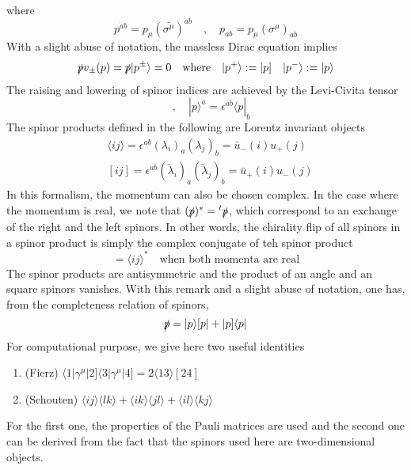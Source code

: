 where 
\begin{equation*}
p^{\dot{a}b} = p_\mu(\bar{\sigma^\mu})^{\dot{a}b}
\quad,\quad
p_{a\dot{b}} = p_\mu(\sigma^\mu)_{a\dot{b}}
\end{equation*}
With a slight abuse of notation, the massless Dirac equation implies
\begin{equation*}
\slashed{p}v_\pm (p) = \slashed{p}|p^\pm\rangle = 0
\quad \mathrm{where}\quad
|p^+\rangle := |p]
\quad
|p^-\rangle := |p\rangle
\end{equation*}
The raising and lowering of spinor indices are achieved by the Levi-Civita tensor
\begin{equation*}
[p|^a = \epsilon^{ab}|p] \quad,\quad
|p\rangle^{\dot{a}} = \epsilon^{\dot{a}\dot{b}}\langle p |_{\dot{b}}
\end{equation*}
The spinor products defined in the following are Lorentz invariant objects
\begin{equation*}
\begin{split}
& \langle ij \rangle = \epsilon^{ab}(\lambda_i)_a(\lambda_j)_b = \bar{u}_-(i)u_+(j)
\\
& [ij] = \epsilon^{\dot{a}\dot{b}}(\tilde{\lambda}_i)_{\dot{a}}(\tilde{\lambda}_j)_{\dot{b}} = \bar{u}_+(i)u_-(j)
\end{split}
\end{equation*}
In this formalism, the momentum can also be chosen complex. 
In the case where the momentum is real, we note that
$(\slashed{p})^* = {}^t\slashed{p}$, which correspond to an exchange of the right and the left spinors. 
In other words, the chirality flip of all spinors in a spinor product is simply the complex conjugate of teh spinor product
\begin{equation*}
[ij] = \langle ij \rangle^* \quad\textrm{when both momenta are real}
\end{equation*}
The spinor products are antisymmetric and the product of an angle and an square spinors vanishes. 
With this remark and a slight abuse of notation, one has, from the completeness relation of spinors,
\begin{equation*}
\slashed{p} = |p\rangle [p| + |p]\langle p|
\end{equation*}
For computational purpose, we give here two useful identities
\begin{enumerate}
\item (Fierz) $\langle 1 |\gamma^\mu |2]\langle 3 |\gamma^\mu|4] = 2\langle 13 \rangle [24]$
\item (Schouten) $\langle ij \rangle \langle lk \rangle + \langle ik\rangle \langle jl\rangle + \langle il \rangle \langle kj \rangle$
\end{enumerate}
For the first one, the properties of the Pauli matrices are used and the second one can be derived from the fact that the spinors used here are two-dimensional objects.